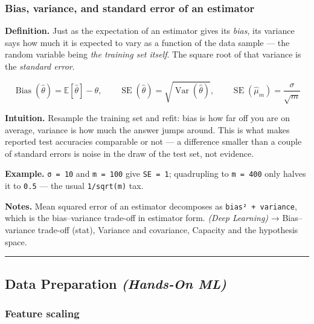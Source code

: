 \documentclass[
  10pt,
  letterpaper,
  onecolumn]{article}
\begin{document}
\hypertarget{bias-variance-and-standard-error-of-an-estimator}{%
\subsubsection{Bias, variance, and standard error of an
estimator}\label{bias-variance-and-standard-error-of-an-estimator}}

\textbf{Definition.} Just as the expectation of an estimator gives its
\emph{bias}, its variance says how much it is expected to vary as a
function of the data sample --- the random variable being \emph{the
training set itself}. The square root of that variance is the
\emph{standard error}.

\begin{equation*}
\operatorname{Bias}(\hat\theta)=\mathbb{E}[\hat\theta]-\theta,
\qquad
\operatorname{SE}(\hat\theta)=\sqrt{\operatorname{Var}(\hat\theta)},
\qquad
\operatorname{SE}(\hat\mu_m)=\frac{\sigma}{\sqrt{m}}
\end{equation*}

\textbf{Intuition.} Resample the training set and refit: bias is how far
off you are on average, variance is how much the answer jumps around.
This is what makes reported test accuracies comparable or not --- a
difference smaller than a couple of standard errors is noise in the
draw of the test set, not evidence.

\textbf{Example.} \texttt{σ\ =\ 10} and \texttt{m\ =\ 100} give
\texttt{SE\ =\ 1}; quadrupling to \texttt{m\ =\ 400} only halves it to
\texttt{0.5} --- the usual \texttt{1/sqrt(m)} tax.

\textbf{Notes.} Mean squared error of an estimator decomposes as
\texttt{bias²\ +\ variance}, which is the bias--variance trade-off in
estimator form. \emph{(Deep Learning)} → Bias--variance trade-off
(stat), Variance and covariance, Capacity and the hypothesis space.

\begin{center}\rule{0.5\linewidth}{0.5pt}\end{center}

\hypertarget{data-preparation-hands-on-ml}{%
\subsection{\texorpdfstring{Data Preparation \emph{(Hands-On
ML)}}{Data Preparation (Hands-On ML)}}\label{data-preparation-hands-on-ml}}

\hypertarget{feature-scaling}{%
\subsubsection{Feature scaling}\label{feature-scaling}}
\end{document}
